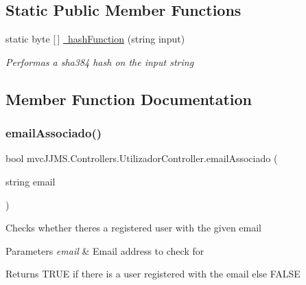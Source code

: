 \subsection*{Static Public Member Functions}
\begin{DoxyCompactItemize}
\item 
static byte \mbox{[}$\,$\mbox{]} \mbox{\hyperlink{classmvc_j_j_m_s_1_1_controllers_1_1_utilizador_controller_a72e105c651070200f84c3718fdf3c8cc}{ hash\+Function}} (string input)
\begin{DoxyCompactList}\small\item\em Performas a sha384 hash on the input string \end{DoxyCompactList}\end{DoxyCompactItemize}


\subsection{Member Function Documentation}
\mbox{\label{classmvc_j_j_m_s_1_1_controllers_1_1_utilizador_controller_abc0b8e9e7e35ee0c6f910a4fc63bb6d2}} 
\subsubsection{\texorpdfstring{email\+Associado()}{emailAssociado()}}
{\footnotesize\ttfamily bool mvc\+J\+J\+M\+S.\+Controllers.\+Utilizador\+Controller.\+email\+Associado (\begin{DoxyParamCaption}\item[{string}]{email }\end{DoxyParamCaption})\hspace{0.3cm}{\ttfamily [inline]}}



Checks whether there\textquotesingle{}s a registered user with the given email 


\begin{DoxyParams}{Parameters}
{\em email} & Email address to check for\\
\hline
\end{DoxyParams}
\begin{DoxyReturn}{Returns}
T\+R\+UE if there is a user registered with the email else F\+A\+L\+SE
\end{DoxyReturn}
\mbox{\label{classmvc_j_j_m_s_1_1_controllers_1_1_utilizador_controller_a11bcddd35c8eeaaea9a7baf761b8f877}} 
